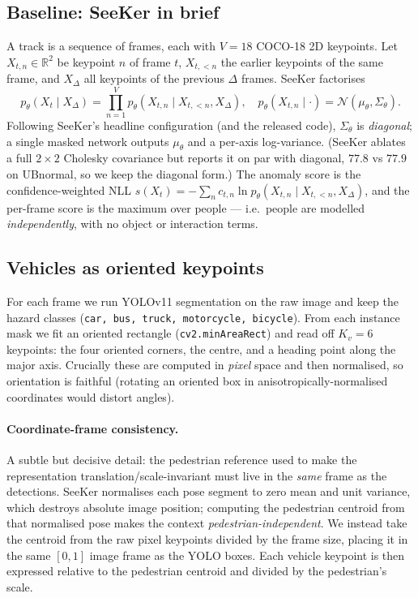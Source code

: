 \documentclass{article}
\begin{document}
\subsection{Baseline: SeeKer in brief}
A track is a sequence of frames, each with $V{=}18$ COCO-18 2D keypoints. Let
$X_{t,n}\!\in\!\mathbb{R}^2$ be keypoint $n$ of frame $t$, $X_{t,<n}$ the earlier
keypoints of the same frame, and $X_\Delta$ all keypoints of the previous
$\Delta$ frames. SeeKer factorises
\begin{equation}
\label{eq:seeker}
p_\theta(X_t\mid X_\Delta)=\prod_{n=1}^{V} p_\theta\!\left(X_{t,n}\mid X_{t,<n},X_\Delta\right),
\quad
p_\theta(X_{t,n}\mid\cdot)=\mathcal{N}(\mu_\theta,\Sigma_\theta).
\end{equation}
Following SeeKer's headline configuration (and the released code), $\Sigma_\theta$
is \emph{diagonal}; a single masked network outputs $\mu_\theta$ and a per-axis
log-variance. (SeeKer ablates a full $2{\times}2$ Cholesky covariance but reports
it on par with diagonal, $77.8$ vs $77.9$ on UBnormal, so we keep the diagonal
form.) The anomaly score is the confidence-weighted NLL
$s(X_t)=-\sum_n c_{t,n}\ln p_\theta(X_{t,n}\mid X_{t,<n},X_\Delta)$, and the
per-frame score is the maximum over people --- i.e.\ people are modelled
\emph{independently}, with no object or interaction terms.

\subsection{Vehicles as oriented keypoints}
\label{ssec:carmatrix}
For each frame we run YOLOv11 segmentation on the raw image and keep the hazard
classes (\texttt{car, bus, truck, motorcycle, bicycle}). From each instance mask
we fit an oriented rectangle (\texttt{cv2.minAreaRect}) and read off $K_v{=}6$
keypoints: the four oriented corners, the centre, and a heading point along the
major axis. Crucially these are computed in \emph{pixel} space and then
normalised, so orientation is faithful (rotating an oriented box in
anisotropically-normalised coordinates would distort angles).

\paragraph{Coordinate-frame consistency.} A subtle but decisive detail: the
pedestrian reference used to make the representation translation/scale-invariant
must live in the \emph{same} frame as the detections. SeeKer normalises each pose
segment to zero mean and unit variance, which destroys absolute image position;
computing the pedestrian centroid from that normalised pose makes the context
\emph{pedestrian-independent}. We instead take the centroid from the raw pixel
keypoints divided by the frame size, placing it in the same $[0,1]$ image frame
as the YOLO boxes. Each vehicle keypoint is then expressed relative to the
pedestrian centroid and divided by the pedestrian's scale.
\end{document}
